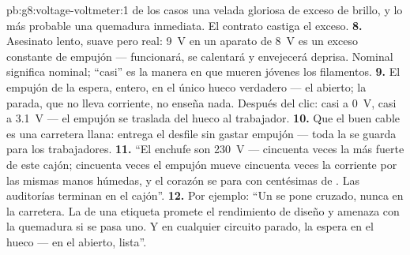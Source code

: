 \begin{solution}{pb:g8:voltage-voltmeter:1}
de los casos una velada gloriosa de exceso de brillo, y lo más probable
una quemadura inmediata. El contrato castiga el exceso.
\textbf{8.} Asesinato lento, suave pero real: \qty{9}{V} en un aparato
de \qty{8}{V} es un exceso constante de empujón --- funcionará, se
calentará y envejecerá deprisa. Nominal significa nominal; ``casi'' es
la manera en que mueren jóvenes los filamentos.
\textbf{9.} El empujón de la  espera, entero, en el único
hueco verdadero --- el  abierto; la 
parada, que no lleva corriente, no enseña nada. Después del clic:
 casi a \qty{0}{V},  casi a
\qty{3.1}{V} --- el empujón se traslada del hueco al trabajador.
\textbf{10.} Que el buen cable es una carretera llana: entrega el
desfile sin gastar empujón --- toda la  se guarda para los
trabajadores.
\textbf{11.} ``El enchufe son \qty{230}{V} --- cincuenta veces la 
más fuerte de este cajón; cincuenta veces el empujón mueve cincuenta
veces la corriente por las mismas manos húmedas, y el corazón se para
con centésimas de . Las auditorías terminan en el
cajón''.
\textbf{12.} Por ejemplo: ``Un  se pone cruzado, nunca
en la carretera. La  de una etiqueta promete el
rendimiento de diseño y amenaza con la quemadura si se pasa uno. Y en
cualquier circuito parado, la  espera en el hueco --- en el
 abierto, lista''.
\end{solution}
